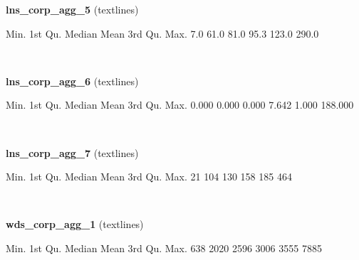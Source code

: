 \documentclass[]{article}
\newenvironment{Shaded}{\begin{snugshade}}{\end{snugshade}}
\newcommand{\DecValTok}[1]{\textcolor[rgb]{0.00,0.00,0.81}{{#1}}}
\newcommand{\FloatTok}[1]{\textcolor[rgb]{0.00,0.00,0.81}{{#1}}}
\newcommand{\NormalTok}[1]{{#1}}
\begin{document}
\textbf{lns\_corp\_agg\_5} (textlines)

\begin{Shaded}
\begin{Highlighting}[]
   \NormalTok{Min. 1st Qu.  Median    Mean 3rd Qu.    Max. }
    \FloatTok{7.0}    \FloatTok{61.0}    \FloatTok{81.0}    \FloatTok{95.3}   \FloatTok{123.0}   \FloatTok{290.0} 
\end{Highlighting}
\end{Shaded}

~

\vspace{1em}

\textbf{lns\_corp\_agg\_6} (textlines)

\begin{Shaded}
\begin{Highlighting}[]
   \NormalTok{Min. 1st Qu.  Median    Mean 3rd Qu.    Max. }
  \FloatTok{0.000}   \FloatTok{0.000}   \FloatTok{0.000}   \FloatTok{7.642}   \FloatTok{1.000} \FloatTok{188.000} 
\end{Highlighting}
\end{Shaded}

~

\vspace{1em}

\textbf{lns\_corp\_agg\_7} (textlines)

\begin{Shaded}
\begin{Highlighting}[]
   \NormalTok{Min. 1st Qu.  Median    Mean 3rd Qu.    Max. }
     \DecValTok{21}     \DecValTok{104}     \DecValTok{130}     \DecValTok{158}     \DecValTok{185}     \DecValTok{464} 
\end{Highlighting}
\end{Shaded}

~

\vspace{1em}

\textbf{wds\_corp\_agg\_1} (textlines)

\begin{Shaded}
\begin{Highlighting}[]
   \NormalTok{Min. 1st Qu.  Median    Mean 3rd Qu.    Max. }
    \DecValTok{638}    \DecValTok{2020}    \DecValTok{2596}    \DecValTok{3006}    \DecValTok{3555}    \DecValTok{7885} 
\end{Highlighting}
\end{Shaded}

~

\vspace{1em}
\end{document}
